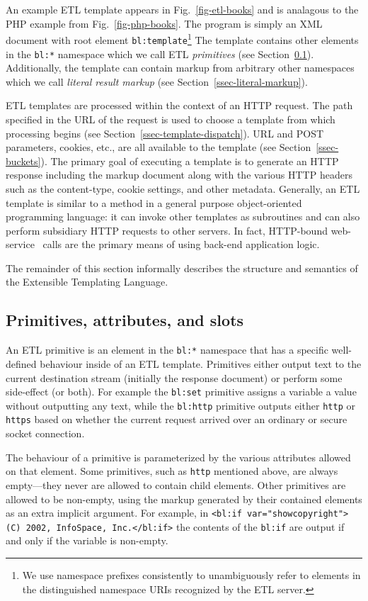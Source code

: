 \documentclass{www2003-submission}
\newcommand{\smtexttt}[1]{{\small\texttt{#1}}}
\newcommand{\ns}[1]{{\small\texttt{#1:*}}}
\newcommand{\figref}[1]{Fig.~\ref{fig-#1}}
\newcommand{\ssecref}[1]{Section~\ref{ssec-#1}}
\begin{document}
An example ETL template appears in \figref{etl-books} and is analagous
to the PHP example from \figref{php-books}.  The program is simply an
XML document with root element \smtexttt{bl:template}\footnote{We use
namespace prefixes consistently to unambiguously refer to elements in
the distinguished namespace URIs recognized by the ETL server.}  The
template contains other elements in the \ns{bl} namespace which we
call ETL \emph{primitives} (see \ssecref{primitives}).  Additionally,
the template can contain markup from arbitrary other namespaces which
we call \emph{literal result markup} (see \ssecref{literal-markup}).

ETL templates are processed within the context of an HTTP request.
The path specified in the URL of the request is used to choose a
template from which processing begins (see
\ssecref{template-dispatch}).  URL and POST parameters, cookies, etc.,
are all available to the template (see
\ssecref{buckets}). The primary goal of executing a template is to
generate an HTTP response including the markup document along with the
various HTTP headers such as the content-type, cookie settings, and
other metadata.  Generally, an ETL template is similar to a method in
a general purpose object-oriented programming language: it can invoke
other templates as subroutines and can also perform subsidiary HTTP
requests to other servers.  In fact, HTTP-bound
web-service~\cite{WebServices} calls are the primary means of using
back-end application logic.

The remainder of this section informally describes the structure and
semantics of the Extensible Templating Language.


\subsection{Primitives, attributes, and slots}
\label{ssec-primitives}

An ETL primitive is an element in the \ns{bl} namespace that has a
specific well-defined behaviour inside of an ETL template.  Primitives
either output text to the current destination stream (initially the
response document) or perform some side-effect (or both).  For example
the \smtexttt{bl:set} primitive assigns a variable a value without
outputting any text, while the
\smtexttt{bl:http} primitive outputs either \smtexttt{http} or
\smtexttt{https} based on whether the current request arrived over an
ordinary or secure socket connection.

The behaviour of a primitive is parameterized by the various
attributes allowed on that element.  Some primitives, such as
\smtexttt{http} mentioned above, are always empty---they never are
allowed to contain child elements. 
Other primitives are allowed to be non-empty, using the markup generated
by their contained elements as an extra implicit argument.  For example,
in \smtexttt{<bl:if var="showcopyright">(C) 2002, InfoSpace,
  Inc.</bl:if>} the contents of the \smtexttt{bl:if} are output if and
only if the variable is non-empty.
\end{document}

